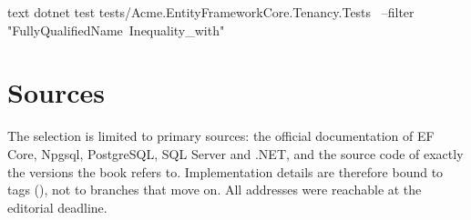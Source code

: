 \begin{sourcecode}[Shell]{text}
dotnet test tests/Acme.EntityFrameworkCore.Tenancy.Tests \
    --filter "FullyQualifiedName~Inequality_with"
\end{sourcecode}

\chapter{Sources}\label{app:F}

The selection is limited to primary sources: the official documentation of EF Core, Npgsql,
PostgreSQL, SQL Server and .NET, and the source code of exactly the versions the book refers
to. Implementation details are therefore bound to tags (\code{v10.0.0}), not to branches that
move on. All addresses were reachable at the editorial deadline.

